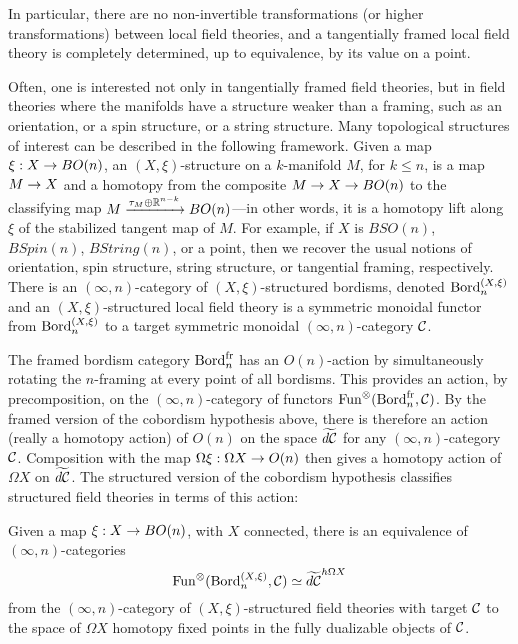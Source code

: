 \documentclass{amsart}
\begin{document}
\noindent In particular, there are no non-invertible transformations (or higher transformations) between local field theories, and a tangentially framed local field theory is completely determined, up to equivalence, by its value on a point.

Often, one is interested not only in tangentially framed field theories, but in field theories where the manifolds have a structure weaker than a framing, such as an orientation, or a spin structure, or a string structure.  Many topological structures of interest can be described in the following framework.  Given a map $\xi : X \rightarrow BO(n)$, an $(X,\xi)$-structure on a $k$-manifold $M$, for $k \leq n$, is a map $M \rightarrow X$ and a homotopy from the composite $M \rightarrow X \rightarrow BO(n)$ to the classifying map $M \xrightarrow{\tau_M \oplus \mathbb R^{n-k}} BO(n)$---in other words, it is a homotopy lift along $\xi$ of the stabilized tangent map of $M$.  For example, if $X$ is $BSO(n)$, $BSpin(n)$, $BString(n)$, or a point, then we recover the usual notions of orientation, spin structure, string structure, or tangential framing, respectively.  There is an $(\infty,n)$-category of $(X,\xi)$-structured bordisms, denoted $\mathrm{Bord}^{(X,\xi)}_n$ and an $(X,\xi)$-structured local field theory is a symmetric monoidal functor from $\mathrm{Bord}^{(X,\xi)}_n$ to a target symmetric monoidal $(\infty,n)$-category $\mathcal C$.

The framed bordism category $\mathrm{Bord}^\mathrm{fr}_n$ has an $O(n)$-action by simultaneously rotating the $n$-framing at every point of all bordisms.  This provides an action, by precomposition, on the $(\infty,n)$-category of functors $\operatorname{Fun}^\otimes(\mathrm{Bord}^\mathrm{fr}_n,\mathcal C)$.  By the framed version of the cobordism hypothesis above, there is therefore an action (really a homotopy action) of $O(n)$ on the space $\widetilde{d\mathcal C}$ for any $(\infty,n)$-category $\mathcal C$.  Composition with the map $\Omega \xi: \Omega X \rightarrow O(n)$ then gives a homotopy action of $\Omega X$ on $\widetilde{d\mathcal C}$.  The structured version of the cobordism hypothesis classifies structured field theories in terms of this action: 
\begin{apptheorem} \label{thm:chstruc}
Given a map $\xi: X \rightarrow BO(n)$, with $X$ connected, there is an equivalence of $(\infty,n)$-categories
\[
\operatorname{Fun}^\otimes(\mathrm{Bord}^{(X,\xi)}_n,\mathcal C) \simeq \widetilde{d\mathcal C}^{h\Omega X}
\]
from the $(\infty,n)$-category of $(X,\xi)$-structured field theories with target $\mathcal C$ to the space of $\Omega X$ homotopy fixed points in the fully dualizable objects of $\mathcal C$.
\end{apptheorem}



\end{document}
